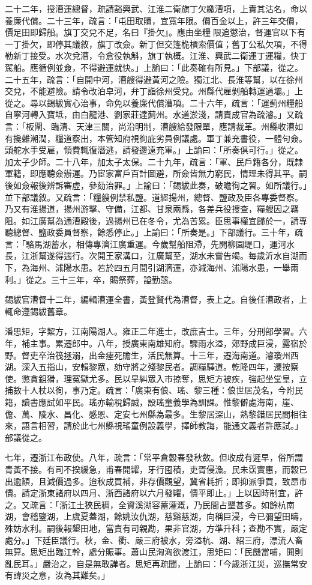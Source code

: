 \begin{pinyinscope}
二十二年，授漕運總督，疏請豁興武、江淮二衛旗丁欠繳漕項，上責其沽名，命以養廉代償。二十三年，疏言：「屯田取贖，宜寬年限。價百金以上，許三年交價，價足田即歸船。旗丁交兌不足，名曰『掛欠』。應由坐糧限追懲治，督運官以下有一丁掛欠，即停其議敘，旗丁改僉。新丁但交篷桅槓索價值；舊丁公私欠項，不得勒新丁接受。水次兌漕，令倉役執斛，旗丁執概。江淮、興武二衛運丁運糧，快丁駕船。應循例並僉，不得避運就快。」上諭曰：「此奏確有所見。」下部議，從之。二十五年，疏言：「自開中河，漕艘得避黃河之險。獨江北、長淮等幫，以在徐州交兌，不能避險。請令改泊皁河，弁丁詣徐州受兌。州縣代雇剝船轉運過壩。」上從之。尋以錫紱實心治事，命免以養廉代償漕項。二十六年，疏言：「運薊州糧船自寧河轉入寶坻，由白龍港、劉家莊達薊州。水道淤淺，請責成官為疏濬。」又疏言：「板閘、臨清、天津三關，尚沿明制，漕艘給發限單，應請裁革。州縣收漕如有攙雜潮潤，糧道察出，本管知府視徇庇劣員例議處。軍丁兼充書役，一體句僉。頭舵水手受雇，領費輒復潛逃，請發邊遠充軍。」上諭曰：「所奏俱可行。」從之。加太子少師。二十八年，加太子太保。二十九年，疏言：「軍、民戶籍各分，既隸軍籍，即應聽僉辦運。乃宦家富戶百計圖避，所僉皆無力窮民，情理未得其平。嗣後如僉報後辨訴審虛，參劾治罪。」上諭曰：「錫紱此奏，破瞻徇之習。如所議行。」並下部議敘。又疏言：「糧艘例禁私鹽。道經揚州，總督、鹽政及臣各專委督察。乃又有淮揚道，揚州游擊、守備，江都、甘泉兩縣，各差兵役搜查，糧艘因之羈阻。如江廣幫為通漕殿後，過揚州已在冬令，尤為苦累。臣思事權宜歸於一，請專聽總督、鹽政委員督察，餘悉停止。」上諭曰：「所奏是。」下部議行。三十年，疏言：「駱馬湖蓄水，相傳專濟江廣重運。今歲幫船阻滯，先開柳園堤口，運河水長，江浙幫遂得遄行。次開王家溝口，江廣幫至，湖水未嘗告竭。每歲沂水自湖而下，為海州、沭陽水患。若於四五月間引湖濟運，亦減海州、沭陽水患，一舉兩利。」從之。三十三年，卒，賜祭葬，謚勤愨。

錫紱官漕督十二年，編輯漕運全書，黃登賢代為漕督，表上之。自後任漕政者，上輒命遵錫紱舊章。

潘思矩，字絜方，江南陽湖人。雍正二年進士，改庶吉士。三年，分刑部學習。六年，補主事。累遷郎中。八年，授廣東南雄知府。驟雨水溢，郊野成巨浸，露宿於野。督吏卒治筏拯溺，出金瘞死贍生，活民無算。十三年，遷海南道。濬瓊州西湖。深入五指山，安輯黎眾，劾守將之殘黎民者。調糧驛道。乾隆四年，遷按察使。懲貪鉏猾，理冤獄尤多。民以旱糾眾入巿掠奪，思矩方被疾，強起坐堂皇，立捕數十人杖以徇，事乃定。疏言：「廣東有俍、瑤、黎三種：俍世居茂名，今附民籍，讀書應試如平民。瑤亦輸稅歸誠，設瑤童義學為訓課。惟黎僻處海南，崖、儋、萬、陵水、昌化、感恩、定安七州縣為最多。生黎居深山，熟黎錯居民間相往來，語言相習，請於此七州縣視瑤童例設義學，擇師教誨，能通文義者許應試。」部議從之。

七年，遷浙江布政使。八年，疏言：「常平倉穀春發秋斂。但收成有遲早，俗所謂青黃不接。有司不揆緩急，甫春開糶，牙行囤積，吏胥侵漁。民未霑實惠，而穀已出逾額，且減價過多。迨秋成買補，非存價觀望，冀省耗折；即抑派爭買，致昂巿價。請定浙東諸府以四月、浙西諸府以六月發糶，價平即止。」上以因時制宜，許之。又疏言：「浙江土狹民稠，全資溪湖容蓄灌溉，乃民間占墾甚多。如餘杭南湖，會稽鑒湖，上虞夏蓋湖，餘姚汝仇湖，慈谿慈湖，向稱巨浸，今已彌望田疇，殊妨水利。嗣後報墾田地，當責有司親勘，果非官湖，方準升科；查勘不實，嚴定處分。」下廷臣議行。秋，金、衢、嚴三府被水，旁溢杭、湖、紹三府，漂流人畜無算。思矩出臨江幹，處分賑事。蕭山民洶洶欲渡江，思矩曰：「民饑當哺，閧則亂民耳。」嚴治之，自是無敢譁者。思矩再疏聞，上諭曰：「今歲浙江災，巡撫常安有諱災之意，汝為其難矣。」


\end{pinyinscope}
